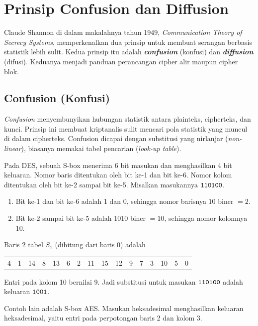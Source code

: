 \section{Prinsip Confusion dan Diffusion}

Claude Shannon di dalam makalahnya tahun 1949, \textit{Communication Theory of
Secrecy Systems}, memperkenalkan dua prinsip untuk membuat serangan berbasis
statistik lebih sulit. Kedua prinsip itu adalah \textbf{\textit{confusion}}
(konfusi) dan \textbf{\textit{diffusion}} (difusi). Keduanya menjadi panduan
perancangan cipher alir maupun cipher blok.

\subsection{Confusion (Konfusi)}

\textit{Confusion} menyembunyikan hubungan statistik antara plainteks,
cipherteks, dan kunci. Prinsip ini membuat kriptanalis sulit mencari pola
statistik yang muncul di dalam cipherteks. Confusion dicapai dengan substitusi
yang nirlanjar (\textit{non-linear}), biasanya memakai tabel pencarian
(\textit{look-up table}).

Pada DES, sebuah S-box menerima 6 bit masukan dan menghasilkan 4 bit keluaran.
Nomor baris ditentukan oleh bit ke-1 dan bit ke-6. Nomor kolom ditentukan oleh
bit ke-2 sampai bit ke-5. Misalkan masukannya $\texttt{110100}$.
\begin{enumerate}
    \item Bit ke-1 dan bit ke-6 adalah 1 dan 0, sehingga nomor barisnya
          $10$ biner $= 2$.
    \item Bit ke-2 sampai bit ke-5 adalah $1010$ biner $= 10$, sehingga nomor
          kolomnya 10.
\end{enumerate}
Baris 2 tabel $S_1$ (dihitung dari baris 0) adalah
\begin{center}
\small
\begin{tabular}{@{}c c c c c c c c c c c c c c c c@{}}
4 & 1 & 14 & 8 & 13 & 6 & 2 & 11 & 15 & 12 & 9 & 7 & 3 & 10 & 5 & 0
\end{tabular}
\end{center}
Entri pada kolom 10 bernilai 9. Jadi substitusi untuk masukan $\texttt{110100}$
adalah keluaran $\texttt{1001}$.

Contoh lain adalah S-box AES. Masukan  heksadesimal menghasilkan
keluaran  heksadesimal, yaitu entri pada perpotongan baris 2 dan
kolom 3.

